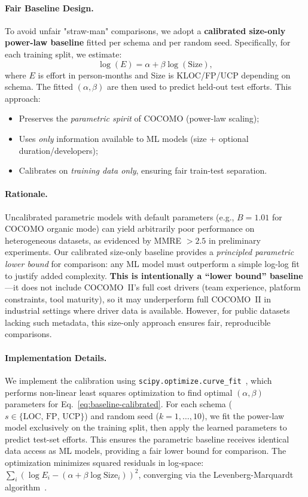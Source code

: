 \documentclass{ieeeaccess}
\begin{document}
\paragraph{Fair Baseline Design.}
To avoid unfair "straw-man" comparisons, we adopt a \textbf{calibrated size-only power-law baseline} fitted per schema and per random seed. Specifically, for each training split, we estimate:
\begin{equation}
\log(E) = \alpha + \beta \log(\text{Size}),
\label{eq:baseline-calibrated}
\end{equation}
where $E$ is effort in person-months and Size is KLOC/FP/UCP depending on schema. The fitted $(\alpha, \beta)$ are then used to predict held-out test efforts. This approach:
\begin{itemize}[leftmargin=1.5em]
    \item Preserves the \textit{parametric spirit} of COCOMO (power-law scaling);
    \item Uses \textit{only} information available to ML models (size + optional duration/developers);
    \item Calibrates on \textit{training data only}, ensuring fair train-test separation.
\end{itemize}

\paragraph{Rationale.}
Uncalibrated parametric models with default parameters (e.g., $B=1.01$ for COCOMO organic mode) can yield arbitrarily poor performance on heterogeneous datasets, as evidenced by MMRE $>2.5$ in preliminary experiments. Our calibrated size-only baseline provides a \textit{principled parametric lower bound} for comparison: any ML model must outperform a simple log-log fit to justify added complexity. \textbf{This is intentionally a ``lower bound'' baseline}—it does not include COCOMO~II's full cost drivers (team experience, platform constraints, tool maturity), so it may underperform full COCOMO~II in industrial settings where driver data is available. However, for public datasets lacking such metadata, this size-only approach ensures fair, reproducible comparisons.

\paragraph{Implementation Details.}
We implement the calibration using \texttt{scipy.optimize.curve\_fit}~\cite{virtanen2020scipy}, which performs non-linear least squares optimization to find optimal $(\alpha, \beta)$ parameters for Eq.~\ref{eq:baseline-calibrated}. For each schema ($s \in \{\text{LOC, FP, UCP}\}$) and random seed ($k=1,\ldots,10$), we fit the power-law model exclusively on the training split, then apply the learned parameters to predict test-set efforts. This ensures the parametric baseline receives identical data access as ML models, providing a fair lower bound for comparison. The optimization minimizes squared residuals in log-space: $\sum_i (\log E_i - (\alpha + \beta \log \text{Size}_i))^2$, converging via the Levenberg-Marquardt algorithm~\cite{more1978levenberg}.
\end{document}
